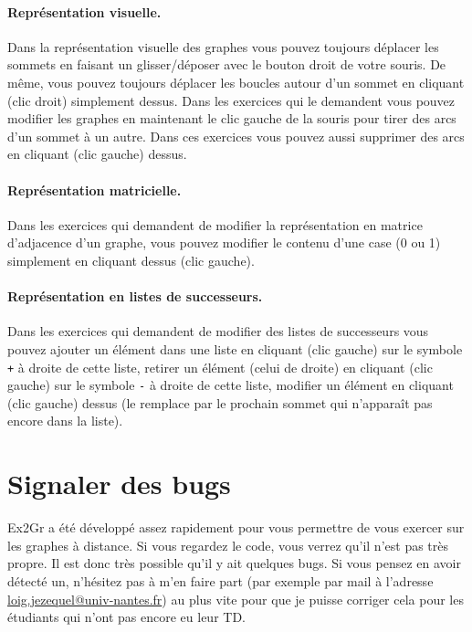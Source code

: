 \documentclass[a4paper]{article}
\begin{document}
\paragraph{Représentation visuelle.} Dans la représentation visuelle des graphes vous pouvez toujours déplacer les sommets en faisant un glisser/déposer avec le bouton droit de votre souris.
De même, vous pouvez toujours déplacer les boucles autour d'un sommet en cliquant (clic droit) simplement dessus.
Dans les exercices qui le demandent vous pouvez modifier les graphes en maintenant le clic gauche de la souris pour tirer des arcs d'un sommet à un autre.
Dans ces exercices vous pouvez aussi supprimer des arcs en cliquant (clic gauche) dessus.

\paragraph{Représentation matricielle.} Dans les exercices qui demandent de modifier la représentation en matrice d'adjacence d'un graphe, vous pouvez modifier le contenu d'une case (0 ou 1) simplement en cliquant dessus (clic gauche).

\paragraph{Représentation en listes de successeurs.} Dans les exercices qui demandent de modifier des listes de successeurs vous pouvez ajouter un élément dans une liste en cliquant (clic gauche) sur le symbole \verb|+| à droite de cette liste, retirer un élément (celui de droite) en cliquant (clic gauche) sur le symbole \verb|-| à droite de cette liste, modifier un élément en cliquant (clic gauche) dessus (le remplace par le prochain sommet qui n'apparaît pas encore dans la liste).

\section*{Signaler des bugs}

Ex2Gr a été développé assez rapidement pour vous permettre de vous exercer sur les graphes à distance.
Si vous regardez le code, vous verrez qu'il n'est pas très propre.
Il est donc très possible qu'il y ait quelques bugs.
Si vous pensez en avoir détecté un, n'hésitez pas à m'en faire part (par exemple par mail à l'adresse \url{loig.jezequel@univ-nantes.fr}) au plus vite pour que je puisse corriger cela pour les étudiants qui n'ont pas encore eu leur TD.
\end{document}
